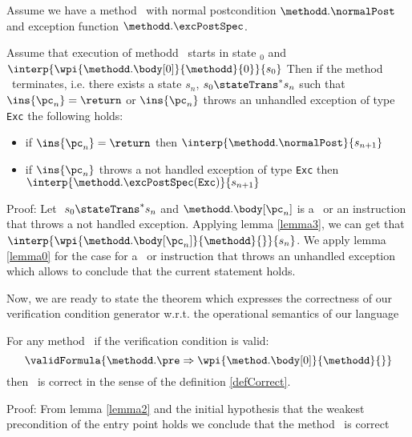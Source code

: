 \begin{lemma2}\label{lemma2}

Assume we have a method \methodd \ with normal postcondition  $\methodd.\normalPost$ and exception function $\methodd.\excPostSpec$. 

 Assume that  execution of methodd \methodd \ starts in state $_{0}$ 
and $\interp{ \wpi{\methodd.\body[0] } {\methodd}{0}}{ s_{0}}$
Then if the method \methodd \ terminates, i.e. there exists a  state $s_n$, $s_0 \stateTrans^{*} s_n $ such that $\ins{\pc_n} = \return $ or
 $\ins{\pc_n}$ throws an unhandled 
exception of type \mbox{\rm\texttt{Exc}} the following holds:
\begin{itemize}
    \item if $\ins{\pc_n} = \return $ then $\interp{ \methodd.\normalPost}{s_{n+1}}$
    \item  if $\ins{\pc_n}$ throws a not handled exception of type \texttt{Exc} then 
             $\interp{ \methodd.\excPostSpec(\mbox{\rm\texttt{Exc}}  )}{s_{n+1}}$
\end{itemize}
\end{lemma2}
Proof: 
Let $ \ s_{0} \stateTrans^{*} s_n $ and $\methodd.\body[\pc_n]$ is a \return \ or an instruction that throws a  not handled exception.
 Applying lemma \ref{lemma3}, we can get that $  \interp{ \wpi{\methodd.\body[\pc_n] } {\methodd}{ } }{ s_{n}}$. We apply lemma \ref{lemma0}
for the case for a \return \ or instruction that throws an unhandled exception which allows to conclude that the current statement holds.



Now, we are ready to state the theorem which expresses the correctness of our verification condition generator
w.r.t. the operational semantics of our language
\begin{vcGenCorrect}\label{vcGenCorrect}
For any  method \methodd \  if the verification condition is valid:
$$ \validFormula{\methodd.\pre \Rightarrow \wpi{\method.\body[0]}{\methodd}{}} $$
 then \methodd \ is correct in the sense of the definition \ref{defCorrect}. 
\end{vcGenCorrect}
Proof: From lemma \ref{lemma2} and the initial hypothesis that the weakest precondition of the 
entry point holds we conclude that the method \methodd \ is correct
